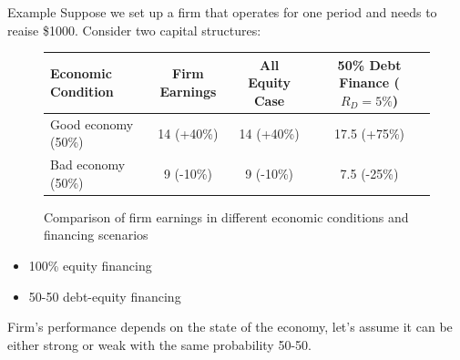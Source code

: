 \begin{examplebox}{Example}
    Suppose we set up a firm that operates for one period and needs to reaise \$1000. Consider two capital structures:

    \begin{figure}[H]
        \centering
        \begin{tabular}{lccc}
        \toprule
        Economic Condition & Firm Earnings & All Equity Case & 50\% Debt Finance ($R_D = 5\%$) \\
        \midrule
        Good economy (50\%) & 14 (+40\%)   & 14 (+40\%)      & 17.5 (+75\%) \\
        Bad economy (50\%)  & 9 (-10\%)    & 9 (-10\%)       & 7.5 (-25\%) \\
        \bottomrule
        \end{tabular}
        \caption{Comparison of firm earnings in different economic conditions and financing scenarios}
    \end{figure}
    

    \begin{itemize}
        \item 100\% equity financing
        \item 50-50 debt-equity financing
    \end{itemize}

    Firm's performance depends on the state of the economy, let's assume it can be either strong or weak with the same probability 50-50.


\end{examplebox}
